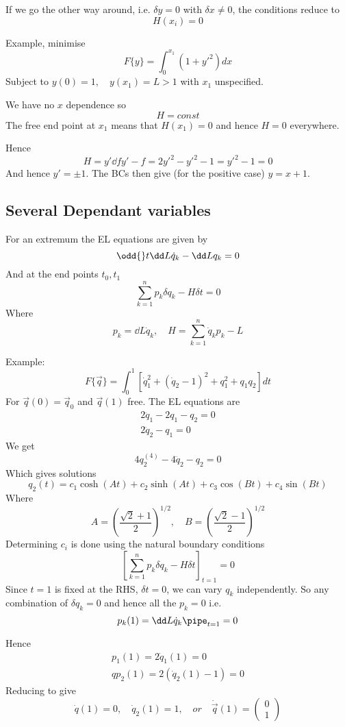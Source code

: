 \documentclass{E:/Documents/Latex/myassignment}
\begin{document}
If we go the other way around, i.e. $\delta y = 0$ with $\delta x \neq 0$, the conditions reduce to
\[H(x_i) = 0\]


Example, minimise
\[F\{y\} = \int_{0}^{x_1} (1+ y'^2) dx\]
Subject to $y(0) = 1, \quad y(x_1) = L > 1$ with $x_1$ unspecified.

We have no $x$ dependence so
\[H = const\]
The free end point at $x_1$ means that $H(x_1) = 0$ and hence $H = 0$ everywhere.

Hence
\[H =y' \dd f{y'} - f = 2y'^2 - y'^2 - 1 = y'^2 -1 = 0\]
And hence $y' = \pm 1$. The BCs then give (for the positive case) $y = x+1$.


\subsection{Several Dependant variables}
For an extremum the EL equations are given by
\[\odd{}t \dd L{\dot{q}_k} - \dd L{q_k} = 0\]
And at the end points $t_0,t_1$
\[\sum_{k=1}^n p_k \delta q_k - H \delta t = 0\]
Where
\[p_k = \dd L{\dot{q}_k}, \quad H = \sum_{k=1}^n \dot q_k p_k - L\]

Example:
\[F\{\vec q\} = \int_0^1 \left[\dot q_1^2 + (\dot q_2 - 1)^2 + q_1^2 + q_1q_2\right] dt\]
For $\vec q(0) = \vec q_0$ and $\vec q(1)$ free.
The EL equations are
\begin{align*}
	2 \ddot q_1 - 2 q_1 - q_2 = 0\\
	2\ddot q_2 - q_1 = 0
\end{align*}
We get
\[4 q_2^{(4)} - 4\ddot q_2 - q_2 = 0\]
Which gives solutions
\[q_2(t) = c_1 \cosh(At) + c_2 \sinh (At) + c_3 \cos(Bt) + c_4 \sin (Bt)\]
Where
\[A = \left(\frac{\sqrt{2} + 1}{2}\right)^{1/2}, \quad B = \left(\frac{\sqrt{2} - 1}{2}\right)^{1/2}\]
Determining $c_i$ is done using the natural boundary conditions
\[\left[\sum_{k=1}^n p_k \delta q_k - H \delta t\right]_{t=1} = 0\]
Since $t=1$ is fixed at the RHS, $\delta t = 0$, we can vary $q_k$ independently. So any combination of $\delta q_k = 0$ and hence all the $p_k = 0$ i.e.
\[p_k(1) = \dd L{\dot q_k} \pipe_{t=1} = 0\]

Hence
\begin{align*}
	p_1(1) = 2 \dot q_1 (1) = 0\\
	qp_2(1) = 2(\dot q_2 (1) - 1) = 0
\end{align*}
Reducing to give
\[\dot q(1) = 0, \quad \dot q_2(1) = 1, \quad or \quad \dot{\vec q}(1) = \begin{pmatrix}
	0\\1
\end{pmatrix}\]
\end{document}
